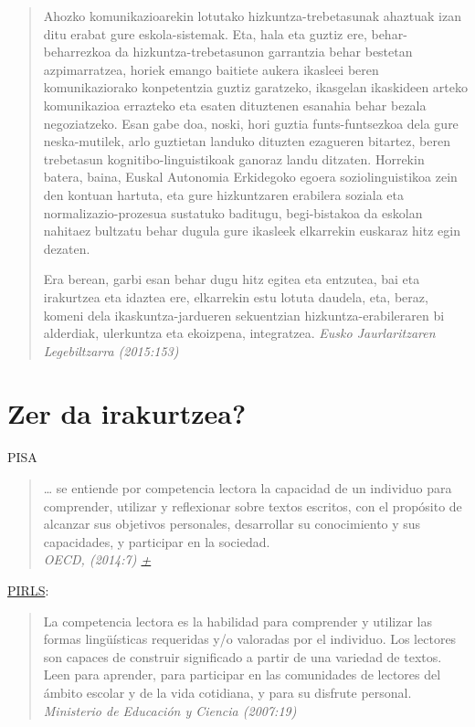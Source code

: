 \documentclass[
]{book}
\begin{document}
\begin{quote}
Ahozko komunikazioarekin lotutako hizkuntza-trebetasunak ahaztuak izan ditu erabat gure eskola-sistemak. Eta, hala eta guztiz ere, behar-beharrezkoa da hizkuntza-trebetasunon garrantzia behar bestetan azpimarratzea, horiek emango baitiete aukera ikasleei beren komunikaziorako konpetentzia guztiz garatzeko, ikasgelan ikaskideen arteko komunikazioa errazteko eta esaten dituztenen esanahia behar bezala negoziatzeko. Esan gabe doa, noski, hori guztia funts-funtsezkoa dela gure neska-mutilek, arlo guztietan landuko dituzten ezagueren bitartez, beren trebetasun kognitibo-linguistikoak ganoraz landu ditzaten. Horrekin batera, baina, Euskal Autonomia Erkidegoko egoera soziolinguistikoa zein den kontuan hartuta, eta gure hizkuntzaren erabilera soziala eta normalizazio-prozesua sustatuko baditugu, begi-bistakoa da eskolan nahitaez bultzatu behar dugula gure ikasleek elkarrekin euskaraz hitz egin dezaten.

Era berean, garbi esan behar dugu hitz egitea eta entzutea, bai eta irakurtzea eta idaztea ere, elkarrekin estu lotuta daudela, eta, beraz, komeni dela ikaskuntza-jardueren sekuentzian hizkuntza-erabileraren bi alderdiak, ulerkuntza eta ekoizpena, integratzea. \emph{Eusko Jaurlaritzaren Legebiltzarra (2015:153)}
\end{quote}

\hypertarget{zer-da-irakurtzea}{%
\section{Zer da irakurtzea?}\label{zer-da-irakurtzea}}

PISA

\begin{quote}
\ldots{} se entiende por competencia lectora la capacidad de un individuo para comprender, utilizar y reflexionar sobre textos escritos, con el propósito de alcanzar sus objetivos personales, desarrollar su conocimiento y sus capacidades, y participar en la sociedad.\\
\emph{OECD, (2014:7) \href{https://www.oecd.org/pisa/39730818.pdf}{+}}
\end{quote}

\href{https://en.wikipedia.org/wiki/Progress_in_International_Reading_Literacy_Study}{PIRLS}:

\begin{quote}
La competencia lectora es la habilidad para comprender y utilizar las formas lingüísticas requeridas y/o valoradas por el individuo. Los lectores son capaces de construir significado a partir de una variedad de textos. Leen para aprender, para participar en las comunidades de lectores del ámbito escolar y de la vida cotidiana, y para su disfrute personal.\\
\emph{Ministerio de Educación y Ciencia (2007:19)}
\end{quote}
\end{document}
